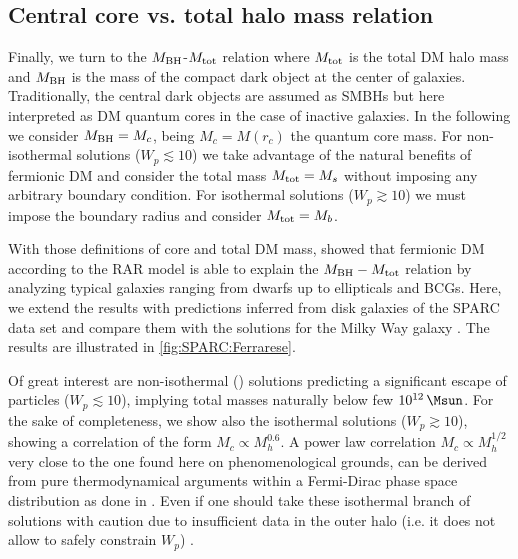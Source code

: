 \subsection{Central core vs. total halo mass relation}
\label{sec:parameter-corelation:ferrarese}


Finally, we turn to the $M_{\rm BH}$-$M_{\rm tot}$ relation \citep{2002ApJ...578...90F,2011Natur.469..377K,2015ApJ...800..124B} where $M_{\rm tot}$ is the total DM halo mass and $M_{\rm BH}$ is the mass of the compact dark object at the center of galaxies. Traditionally, the central dark objects are assumed as SMBHs but here interpreted as DM quantum cores in the case of inactive galaxies. In the following we consider $M_{\rm BH} = M_c$, being $M_c = M(r_c)$ the quantum core mass. For non-isothermal solutions ($W_p \lesssim 10$) we take advantage of the natural benefits of fermionic DM and consider the total mass $M_{\rm tot} = M_s$ without imposing any arbitrary boundary condition. For isothermal solutions ($W_p \gtrsim 10$) we must impose the boundary radius and consider $M_{\rm tot} = M_b$.


With those definitions of core and total DM mass, \citet{2019PDU....24..278A} showed that fermionic DM according to the RAR model is able to explain the $M_{\rm BH} - M_{\rm tot}$ relation by analyzing typical galaxies ranging from dwarfs up to ellipticals and BCGs. Here, we extend the results with predictions inferred from disk galaxies of the SPARC data set and compare them with the solutions for the Milky Way galaxy \citep{2018PDU....21...82A}. The results are illustrated in \cref{fig:SPARC:Ferrarese}.

Of great interest are non-isothermal () solutions predicting a significant escape of particles ($W_p \lesssim 10$), implying total masses naturally below few $\SI{E12}{\Msun}$. For the sake of completeness, we show also the isothermal solutions ($W_p \gtrsim 10$), showing a correlation of the form $M_c \propto M_h^{0.6}$. A power law correlation $M_c \propto M_h^{1/2}$ very close to the one found here on phenomenological grounds, can be derived from pure thermodynamical arguments within a Fermi-Dirac phase space distribution as done in \cite{2019PhRvD.100l3506C}. Even if one should take these isothermal branch of solutions with caution due to insufficient data in the outer halo (i.e. it does not allow to safely constrain $W_p$) . %

